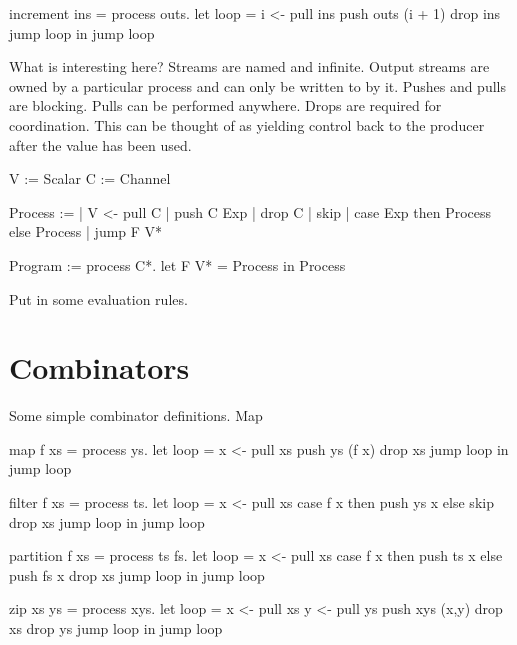 \begin{code}
increment ins = process outs.
  let loop =
     i <- pull ins
     push outs (i + 1)
     drop ins
     jump loop
  in jump loop
\end{code}

What is interesting here?
Streams are named and infinite.
Output streams are owned by a particular process and can only be written to by it.
Pushes and pulls are blocking.
Pulls can be performed anywhere.
Drops are required for coordination.
This can be thought of as yielding control back to the producer after the value has been used.

\begin{code}
V := Scalar
C := Channel

Process :=
  | V <- pull C
  | push C Exp
  | drop C
  | skip
  | case Exp then Process else Process
  | jump F V*

Program :=
  process C*.
  let F V* = Process
  in  Process
\end{code}

Put in some evaluation rules.

\section{Combinators}
\label{s:Combinators}

Some simple combinator definitions.
Map 

\begin{code}
map f xs = process ys.
  let loop =
     x <- pull xs
     push ys (f x)
     drop xs
     jump loop
  in jump loop
\end{code}

\begin{code}
filter f xs = process ts.
  let loop =
     x <- pull xs
     case f x
       then push ys x
       else skip
     drop xs
     jump loop
  in jump loop
\end{code}

\begin{code}
partition f xs = process ts fs.
  let loop =
     x <- pull xs
     case f x
       then push ts x
       else push fs x
     drop xs
     jump loop
  in jump loop
\end{code}

\begin{code}
zip xs ys = process xys.
  let loop =
     x <- pull xs
     y <- pull ys
     push xys (x,y)
     drop xs
     drop ys
     jump loop
  in jump loop
\end{code}

